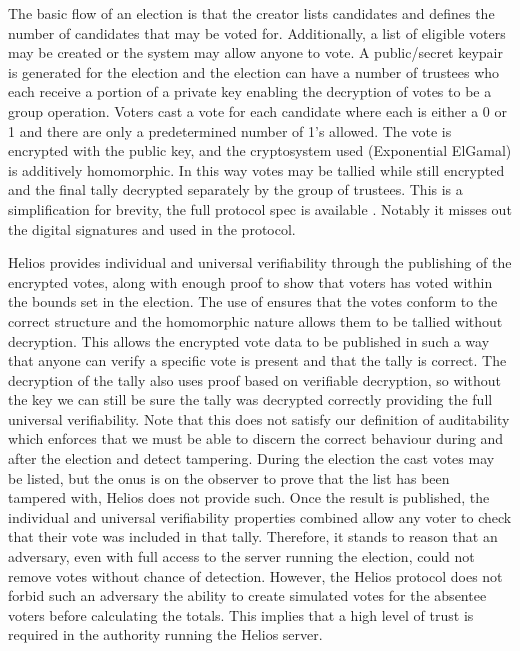 The basic flow of an election is that the creator lists candidates and defines the number of candidates that may be voted for. Additionally, a list of eligible voters may be created or the system may allow anyone to vote. A public/secret keypair is generated for the election and the election can have a number of trustees who each receive a portion of a private key enabling the decryption of votes to be a group operation. Voters cast a vote for each candidate where each is either a 0 or 1 and there are only a predetermined number of 1's allowed. The vote is encrypted with the public key, and the cryptosystem used (Exponential ElGamal) is additively homomorphic. In this way votes may be tallied while still encrypted and the final tally decrypted separately by the group of trustees. This is a simplification for brevity, the full protocol spec is available \cite{HeliosHeliosV3}. Notably it misses out the digital signatures and  used in the protocol.

Helios provides individual and universal verifiability through the publishing of the encrypted votes, along with enough proof to show that voters has voted within the bounds set in the election. The use of  ensures that the votes conform to the correct structure and the homomorphic nature allows them to be tallied without decryption. This allows the encrypted vote data to be published in such a way that anyone can verify a specific vote is present and that the tally is correct. The decryption of the tally also uses proof based on verifiable decryption, so without the key we can still be sure the tally was decrypted correctly providing the full universal verifiability. Note that this does not satisfy our definition of auditability which enforces that we must be able to discern the correct behaviour during and after the election and detect tampering. During the election the cast votes may be listed, but the onus is on the observer to prove that the list has been tampered with, Helios does not provide such. Once the result is published, the individual and universal verifiability properties combined allow any voter to check that their vote was included in that tally. Therefore, it stands to reason that an adversary, even with full access to the server running the election, could not remove votes without chance of detection. However, the Helios protocol does not forbid such an adversary the ability to create simulated votes for the absentee voters before calculating the totals. This implies that a high level of trust is required in the authority running the Helios server.

